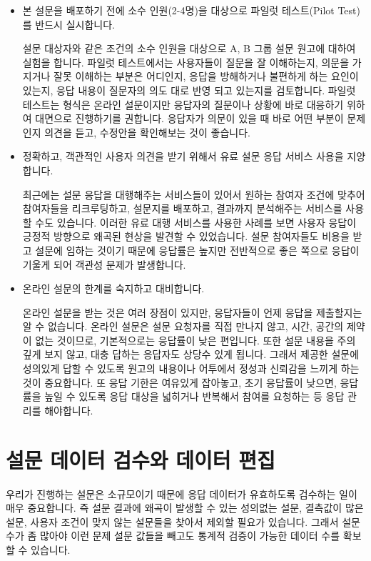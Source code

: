\documentclass[
  letterpaper,
]{book}
\begin{document}
\begin{itemize}
\item
  본 설문을 배포하기 전에 소수 인원(2-4명)을 대상으로 파일럿
  테스트(Pilot Test)를 반드시 실시합니다.

  설문 대상자와 같은 조건의 소수 인원을 대상으로 A, B 그룹 설문 원고에
  대하여 실험을 합니다. 파일럿 테스트에서는 사용자들이 질문을 잘
  이해하는지, 의문을 가지거나 잘못 이해하는 부분은 어디인지, 응답을
  방해하거나 불편하게 하는 요인이 있는지, 응답 내용이 질문자의 의도 대로
  반영 되고 있는지를 검토합니다. 파일럿 테스트는 형식은 온라인
  설문이지만 응답자의 질문이나 상황에 바로 대응하기 위하여 대면으로
  진행하기를 권합니다. 응답자가 의문이 있을 때 바로 어떤 부분이 문제인지
  의견을 듣고, 수정안을 확인해보는 것이 좋습니다.
\item
  정확하고, 객관적인 사용자 의견을 받기 위해서 유료 설문 응답 서비스
  사용을 지양합니다.

  최근에는 설문 응답을 대행해주는 서비스들이 있어서 원하는 참여자 조건에
  맞추어 참여자들을 리크루팅하고, 설문지를 배포하고, 결과까지 분석해주는
  서비스를 사용할 수도 있습니다. 이러한 유료 대행 서비스를 사용한 사례를
  보면 사용자 응답이 긍정적 방향으로 왜곡된 현상을 발견할 수 있었습니다.
  설문 참여자들도 비용을 받고 설문에 임하는 것이기 때문에 응답률은
  높지만 전반적으로 좋은 쪽으로 응답이 기울게 되어 객관성 문제가
  발생합니다.
\item
  온라인 설문의 한계를 숙지하고 대비합니다.

  온라인 설문을 받는 것은 여러 장점이 있지만, 응답자들이 언제 응답을
  제출할지는 알 수 없습니다. 온라인 설문은 설문 요청자를 직접 만나지
  않고, 시간, 공간의 제약이 없는 것이므로, 기본적으로는 응답률이 낮은
  편입니다. 또한 설문 내용을 주의 깊게 보지 않고, 대충 답하는 응답자도
  상당수 있게 됩니다. 그래서 제공한 설문에 성의있게 답할 수 있도록
  원고의 내용이나 어투에서 정성과 신뢰감을 느끼게 하는 것이 중요합니다.
  또 응답 기한은 여유있게 잡아놓고, 초기 응답률이 낮으면, 응답률을 높일
  수 있도록 응답 대상을 넓히거나 반복해서 참여를 요청하는 등 응답 관리를
  해야합니다.
\end{itemize}

\section{설문 데이터 검수와 데이터
편집}\label{uxc124uxbb38-uxb370uxc774uxd130-uxac80uxc218uxc640-uxb370uxc774uxd130-uxd3b8uxc9d1}

우리가 진행하는 설문은 소규모이기 때문에 응답 데이터가 유효하도록
검수하는 일이 매우 중요합니다. 즉 설문 결과에 왜곡이 발생할 수 있는
성의없는 설문, 결측값이 많은 설문, 사용자 조건이 맞지 않는 설문들을
찾아서 제외할 필요가 있습니다. 그래서 설문 수가 좀 많아야 이런 문제 설문
값들을 빼고도 통계적 검증이 가능한 데이터 수를 확보할 수 있습니다.
\end{document}
